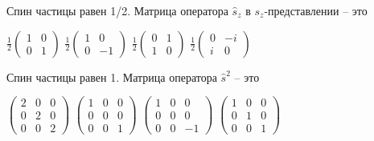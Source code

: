 \documentclass[11pt,a4paper]{exam}
\begin{document}
\begin{questions}
\question Спин частицы равен 1/2. Матрица оператора ${\hat s_z}$ в ${s_z}$-представлении – это
\begin{choices}
\choice $\frac{1}{2}\left( {\begin{array}{*{20}{c}}
1&0\\
0&1
\end{array}} \right)$      
\choice $\frac{1}{2}\left( {\begin{array}{*{20}{c}}
1&0\\
0&{ - 1}
\end{array}} \right)$      
\choice $\frac{1}{2}\left( {\begin{array}{*{20}{c}}
0&1\\
1&0
\end{array}} \right)$      
\choice $\frac{1}{2}\left( {\begin{array}{*{20}{c}}
0&{ - i}\\
i&0
\end{array}} \right)$
\end{choices}

\question Спин частицы равен 1. Матрица оператора ${\hat s^2}$ – это
\begin{choices}
\choice $\left( {\begin{array}{*{20}{c}}
2&0&0\\
0&2&0\\
0&0&2
\end{array}} \right)$      
\choice $\left( {\begin{array}{*{20}{c}}
1&0&0\\
0&0&0\\
0&0&1
\end{array}} \right)$      
\choice $\left( {\begin{array}{*{20}{c}}
1&0&0\\
0&0&0\\
0&0&{ - 1}
\end{array}} \right)$   
\choice $\left( {\begin{array}{*{20}{c}}
1&0&0\\
0&1&0\\
0&0&1
\end{array}} \right)$
\end{choices}


\end{questions}
\end{document}
